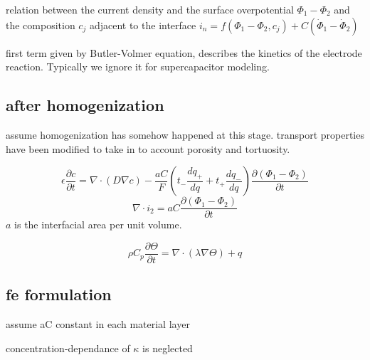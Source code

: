 \documentclass[10pt, oneside]{article}   	%
\begin{document}
relation between the current density and the surface overpotential
$\Phi_1-\Phi_2$ and the composition $c_j$ adjacent to the interface
$i_n = f(\Phi_1-\Phi_2,c_j) + C \left( \dot{\Phi}_1 - \dot{\Phi}_2 \right)$

first term given by Butler-Volmer equation, describes the kinetics of the
electrode reaction.  Typically we ignore it for supercapacitor modeling.

\subsection{after homogenization}
assume homogenization has somehow happened at this stage.
transport properties have been modified to take in to account porosity and
tortuosity.

\begin{equation}
    \epsilon \frac{\partial c}{\partial t} =
        \nabla \cdot \left( D \nabla c \right)
        - \frac{aC}{F} \left( 
            t_- \frac{d q_+}{d q}
            +
            t_+ \frac{d q_-}{d q}
            \right)
            \frac{\partial \left( \Phi_1 - \Phi_2 \right)}{\partial t}
\end{equation}
\begin{equation}
    \nabla \cdot i_2 =
        aC \frac{\partial \left( \Phi_1 - \Phi_2 \right)}{\partial t}
\end{equation}
$a$ is the interfacial area per unit volume.

\begin{equation}
    \rho C_p \frac{\partial \Theta}{\partial t} =
         \nabla \cdot \left( \lambda \nabla \Theta \right)
         +
         q
\end{equation}

\subsection{fe formulation}
assume
aC constant in each material layer

concentration-dependance of $\kappa$ is neglected

\newcommand{\Maa}{\langle \varphi_{i,\Phi_1}, aC \varphi_{j,\Phi_1} \rangle}
\newcommand{\Mab}{-\langle \varphi_{i,\Phi_1}, aC \varphi_{j,\Phi_2} \rangle}
\newcommand{\Mba}{-\langle \varphi_{i,\Phi_1}, aC \varphi_{j,\Phi_2} \rangle}
\newcommand{\Mbb}{\langle \varphi_{i,\Phi_1}, aC \varphi_{j,\Phi_2} \rangle}
\newcommand{\Mca}{\langle \varphi_{i,\Phi_1}, \frac{aC}{F}(t_-\frac{d q_+}{d q} + t_+\frac{d q_-}{d q}) \varphi_{j,c} \rangle}
\newcommand{\Mcb}{-\langle \varphi_{i,\Phi_1}, \frac{aC}{F}(t_-\frac{d q_+}{d q} + t_+\frac{d q_-}{d q}) \varphi_{j,c} \rangle}
\newcommand{\Mcc}{\langle \varphi_{i,c}, \epsilon \varphi_{j,c} \rangle}
\newcommand{\Mdd}{\langle \varphi_{i,\Theta}, \rho C_p \varphi_{j,\Theta} \rangle}
\end{document}

